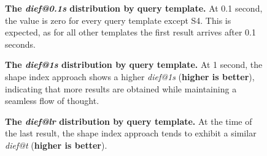 \begin{figure}
    \centering
    
    \caption{
    \textbf{The \textit{dief@0.1s} distribution by query template.}    
    At 0.1 second, the value is zero for every query template except S4. This is expected, as for all other templates the first result arrives after 0.1 seconds.}
    \label{fig:dief_01}
\end{figure}

\begin{figure}
    \centering
    
    \caption{
    \textbf{The \textit{dief@1s} distribution by query template.}    
    At 1 second, the shape index approach shows a higher \textit{dief@1s} (\textbf{higher is better}), indicating that more results are obtained while maintaining a seamless flow of thought.}
    \label{fig:dief_1}
\end{figure}


\begin{figure}
    \centering
    
    \caption{
    \textbf{The \textit{dief@lr} distribution by query template.}    
    At the time of the last result, the shape index approach tends to exhibit a similar \textit{dief@t} (\textbf{higher is better}).}
    \label{fig:dief_lr}
\end{figure}

